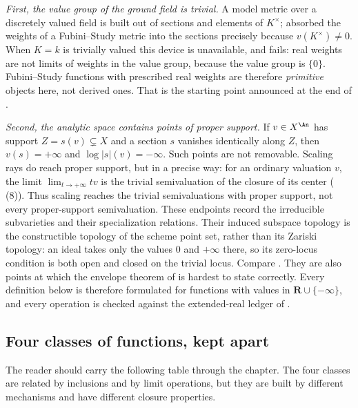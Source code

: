 \emph{First, the value group of the ground field is trivial.}  A model
metric over a discretely valued field is built out of sections and elements
of $K^\times$;  absorbed the weights of a
Fubini--Study metric into the sections precisely because
$v(K^\times)\ne0$.  When $K=k$ is trivially valued this device is
unavailable, and  fails: real weights are
not limits of weights in the value group, because the value group is
$\{0\}$.  Fubini--Study functions with prescribed real weights are
therefore \emph{primitive} objects here, not derived ones.  That is the
starting point announced at the end of .

\emph{Second, the analytic space contains points of proper support.}  If
$v\in X^{\An}$ has support $Z=s(v)\subsetneq X$ and a section $s$
vanishes identically along $Z$, then $v(s)=+\infty$ and
$\log|s|(v)=-\infty$.  Such points are not removable.  Scaling rays do
reach proper support, but in a precise way: for an ordinary valuation $v$,
the limit $\lim_{t\to+\infty}tv$ is the trivial semivaluation of the
closure of its center (\,(8)).  Thus scaling
reaches the trivial semivaluations with proper support, not every
proper-support semivaluation.  These endpoints record the irreducible subvarieties and their
specialization relations.  Their induced subspace topology is the
constructible topology of the scheme point set, rather than its Zariski
topology: an ideal takes only the values $0$ and $+\infty$ there, so its
zero-locus condition is both open and closed on the trivial locus.
Compare .
They are also points at which the envelope theorem of  is hardest
to state correctly.
Every definition below is therefore formulated for functions with values in
$\mathbf R\cup\{-\infty\}$, and every operation is checked against the
extended-real ledger of .

\subsection{Four classes of functions, kept apart}
\label{sec:ch34-four-classes}

The reader should carry the following table through the chapter.  The four
classes are related by inclusions and by limit operations, but they are
built by different mechanisms and have different closure properties.

